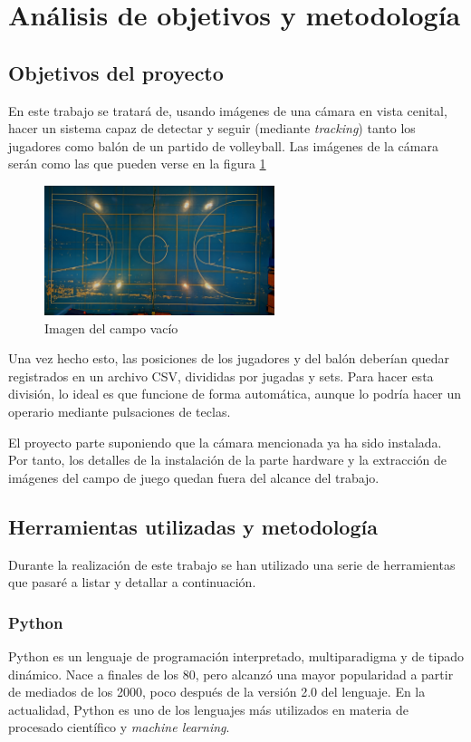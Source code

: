 \section{Análisis de objetivos y metodología}

\subsection{Objetivos del proyecto}
En este trabajo se tratará de, usando imágenes de una cámara en vista cenital, hacer un sistema capaz de detectar y seguir (mediante \textit{tracking}) tanto los jugadores como balón de un partido de volleyball. Las imágenes de la cámara serán como las que pueden verse en la figura \ref{fig:campo}

\begin{figure}
    \centering
    \includegraphics[width=0.6\textwidth]{images/campo}
    \caption{Imagen del campo vacío}
    \label{fig:campo}
\end{figure}

Una vez hecho esto, las posiciones de los jugadores y del balón deberían quedar registrados en un archivo CSV, divididas por jugadas y sets. Para hacer esta división, lo ideal es que funcione de forma automática, aunque lo podría hacer un operario mediante pulsaciones de teclas.

El proyecto parte suponiendo que la cámara mencionada ya ha sido instalada. Por tanto, los detalles de la instalación de la parte hardware y la extracción de imágenes del campo de juego quedan fuera del alcance del trabajo.


\subsection{Herramientas utilizadas y metodología}
Durante la realización de este trabajo se han utilizado una serie de herramientas que pasaré a listar y detallar a continuación.

\subsubsection*{Python}
Python es un lenguaje de programación interpretado, multiparadigma y de tipado dinámico. Nace a finales de los 80, pero alcanzó una mayor popularidad a partir de mediados de los 2000, poco después de la versión 2.0 del lenguaje. En la actualidad, Python es uno de los lenguajes más utilizados en materia de procesado científico y \textit{machine learning}.

